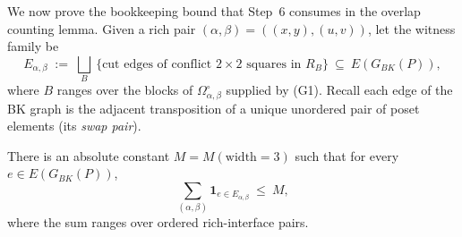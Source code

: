 We now prove the bookkeeping bound that Step~6 consumes in the overlap
counting lemma. Given a rich pair
$(\alpha,\beta)=((x,y),(u,v))$, let the witness family be
\[
E_{\alpha,\beta}\;:=\;\bigsqcup_{B}\ \{\text{cut edges of conflict $2{\times}2$ squares
in }R_B\}\ \subseteq\ E(G_{BK}(P)),
\]
where $B$ ranges over the blocks of $\Omega^\circ_{\alpha,\beta}$ supplied
by (G1). Recall each edge of the BK graph is the adjacent transposition
of a unique unordered pair of poset elements (its \emph{swap pair}).

\begin{lemma}\label{lem:G6}
There is an absolute constant $M=M(\mathrm{width}=3)$ such that for every
$e\in E(G_{BK}(P))$,
\[
\sum_{(\alpha,\beta)}\mathbf{1}_{e\in E_{\alpha,\beta}}\ \le\ M,
\]
where the sum ranges over ordered rich-interface pairs.
\end{lemma}

